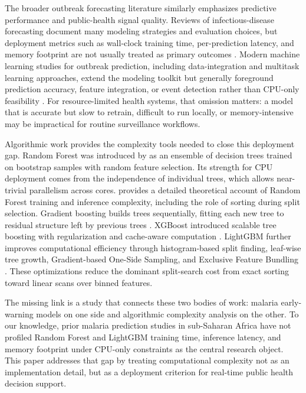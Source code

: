 \documentclass[11pt]{article}
\begin{document}
The broader outbreak forecasting literature similarly emphasizes predictive performance and public-health signal quality. Reviews of infectious-disease forecasting document many modeling strategies and evaluation choices, but deployment metrics such as wall-clock training time, per-prediction latency, and memory footprint are not usually treated as primary outcomes \citep{nsoesie2014forecasting}. Modern machine learning studies for outbreak prediction, including data-integration and multitask learning approaches, extend the modeling toolkit but generally foreground prediction accuracy, feature integration, or event detection rather than CPU-only feasibility \citep{bardak2017outbreak}. For resource-limited health systems, that omission matters: a model that is accurate but slow to retrain, difficult to run locally, or memory-intensive may be impractical for routine surveillance workflows.

Algorithmic work provides the complexity tools needed to close this deployment gap. Random Forest was introduced by \citet{breiman2001random} as an ensemble of decision trees trained on bootstrap samples with random feature selection. Its strength for CPU deployment comes from the independence of individual trees, which allows near-trivial parallelism across cores. \citet{louppe2014understanding} provides a detailed theoretical account of Random Forest training and inference complexity, including the role of sorting during split selection. Gradient boosting builds trees sequentially, fitting each new tree to residual structure left by previous trees \citep{friedman2001greedy}. XGBoost introduced scalable tree boosting with regularization and cache-aware computation \citep{chen2016xgboost}. LightGBM further improves computational efficiency through histogram-based split finding, leaf-wise tree growth, Gradient-based One-Side Sampling, and Exclusive Feature Bundling \citep{ke2017lightgbm}. These optimizations reduce the dominant split-search cost from exact sorting toward linear scans over binned features.

The missing link is a study that connects these two bodies of work: malaria early-warning models on one side and algorithmic complexity analysis on the other. To our knowledge, prior malaria prediction studies in sub-Saharan Africa have not profiled Random Forest and LightGBM training time, inference latency, and memory footprint under CPU-only constraints as the central research object. This paper addresses that gap by treating computational complexity not as an implementation detail, but as a deployment criterion for real-time public health decision support.
\end{document}
